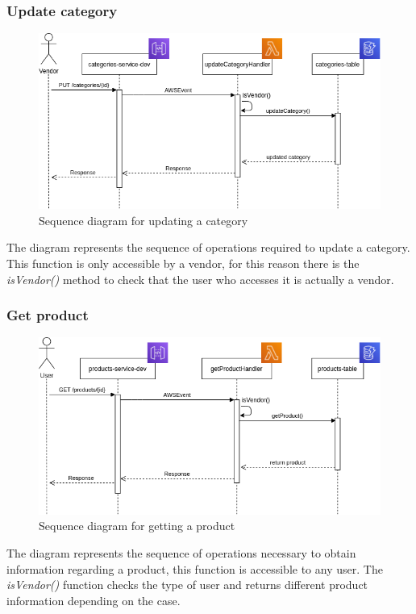 \subsubsection{Update category}
\begin{figure}[!h]
    \vspace{5px}
    \includegraphics[scale=0.5]{../../../../Images/Diagrammi/maintainerManual/updateCategorySequence.png}
    \centering
    \caption{Sequence diagram for updating a category}
\end{figure}
The diagram represents the sequence of operations required to update a category. This function is only accessible by a vendor, for this reason there is the \textit{isVendor()} method to check that the user who accesses it is actually a vendor.
\pagebreak
\subsubsection{Get product}
\begin{figure}[!h]
    \vspace{5px}
    \includegraphics[scale=0.5]{../../../../Images/Diagrammi/maintainerManual/getProductSequence.png}
    \centering
    \caption{Sequence diagram for getting a product}
\end{figure}
The diagram represents the sequence of operations necessary to obtain information regarding a product, this function is accessible to any user. The \textit{isVendor()} function checks the type of user and returns different product information depending on the case.
